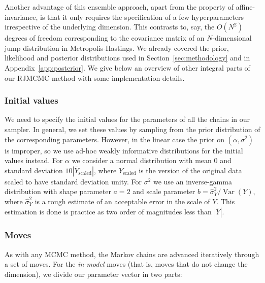 Another advantage of this ensemble approach, apart from the property of affine-invariance, is that it only requires the specification of a few hyperparameters irrespective of the underlying dimension. This contrasts to, say, the \(O(N^2)\) degrees of freedom corresponding to the covariance matrix of an \(N\)-dimensional jump distribution in Metropolis-Hastings. We already covered the prior, likelihood and posterior distributions used in Section~\ref{sec:methodology} and in Appendix~\ref{app:posterior}. We give below an overview of other integral parts of our RJMCMC method with some implementation details.

\subsubsection*{Initial values}

We need to specify the initial values for the parameters of all the chains in our sampler. In general, we set these values by sampling from the prior distribution of the corresponding parameters. However, in the linear case the prior on \((\alpha, \sigma^2)\) is improper, so we use ad-hoc weakly informative distributions for the initial values instead. For \(\alpha\) we consider a normal distribution with mean \(0\) and standard deviation \(10|\bar{Y}_{\text{scaled}}|\), where \(Y_{\text{scaled}}\) is the version of the original data scaled to have standard deviation unity. For \(\sigma^2\) we use an inverse-gamma distribution with shape parameter \(a=2\) and scale parameter \(b=\hat\sigma^2_Y/\operatorname{Var}(Y)\), where \(\hat \sigma^2_Y\) is a rough estimate of an acceptable error in the scale of \(Y\). This estimation is done is practice as two order of magnitudes less than \(|\bar{Y}|\).

\subsubsection*{Moves}

As with any MCMC method, the Markov chains are advanced iteratively through a set of moves. For the \textit{in-model} moves (that is, moves that do not change the dimension), we divide our parameter vector in two parts:

